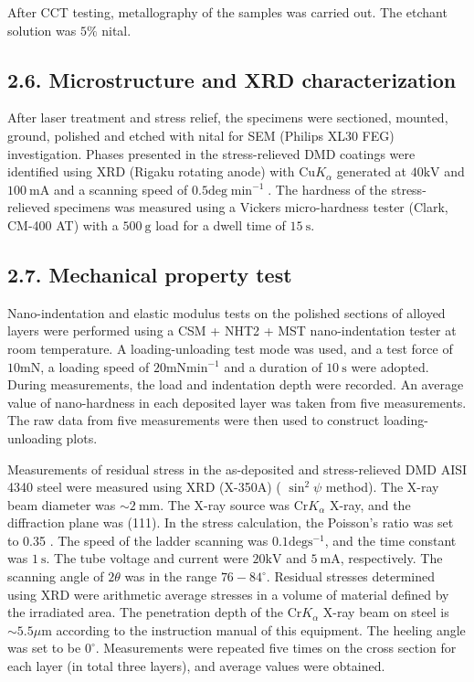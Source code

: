 \documentclass[10pt]{article}
\begin{document}
After CCT testing, metallography of the samples was carried out. The etchant solution was $5 \%$ nital.

\subsection*{2.6. Microstructure and XRD characterization}
After laser treatment and stress relief, the specimens were sectioned, mounted, ground, polished and etched with nital for SEM (Philips XL30 FEG) investigation. Phases presented in the stress-relieved DMD coatings were identified using XRD (Rigaku rotating anode) with $\mathrm{Cu} K_{\alpha}$ generated at $40 \mathrm{kV}$ and $100 \mathrm{~mA}$ and a scanning speed of $0.5 \mathrm{deg} \min ^{-1}$. The hardness of the stress-relieved specimens was measured using a Vickers micro-hardness tester (Clark, CM-400 AT) with a $500 \mathrm{~g}$ load for a dwell time of $15 \mathrm{~s}$.

\subsection*{2.7. Mechanical property test}
Nano-indentation and elastic modulus tests on the polished sections of alloyed layers were performed using a CSM + NHT2 + MST nano-indentation tester at room temperature. A loading-unloading test mode was used, and a test force of $10 \mathrm{mN}$, a loading speed of $20 \mathrm{mN} \mathrm{min}^{-1}$ and a duration of $10 \mathrm{~s}$ were adopted. During measurements, the load and indentation depth were recorded. An average value of nano-hardness in each deposited layer was taken from five measurements. The raw data from five measurements were then used to construct loading-unloading plots.

Measurements of residual stress in the as-deposited and stress-relieved DMD AISI 4340 steel were measured using XRD (X-350A) ( $\sin ^{2} \psi$ method). The X-ray beam diameter was $\sim 2 \mathrm{~mm}$. The X-ray source was $\mathrm{Cr} K_{\alpha}$ X-ray, and the diffraction plane was (111). In the stress calculation, the Poisson's ratio was set to 0.35 . The speed of the ladder scanning was $0.1 \mathrm{deg} \mathrm{s}^{-1}$, and the time constant was $1 \mathrm{~s}$. The tube voltage and current were $20 \mathrm{kV}$ and $5 \mathrm{~mA}$, respectively. The scanning angle of $2 \theta$ was in the range $76-84^{\circ}$. Residual stresses determined using XRD were arithmetic average stresses in a volume of material defined by the irradiated area. The penetration depth of the $\mathrm{Cr} K_{\alpha}$ X-ray beam on steel is $\sim 5.5 \mu \mathrm{m}$ according to the instruction manual of this equipment. The heeling angle was set to be $0^{\circ}$. Measurements were repeated five times on the cross section for each layer (in total three layers), and average values were obtained.
\end{document}
